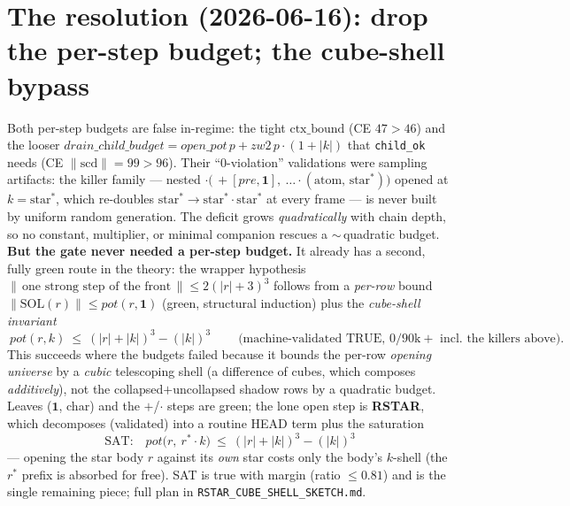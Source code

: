 \documentclass{article}
\newcommand{\rs}[1]{\lvert #1\rvert}                 %
\newcommand{\rss}[1]{\lVert #1\rVert}                %
\newcommand{\sd}{\mathrm{scd}}                       %
\newcommand{\ctxb}{\mathrm{ctx\_bound}}
\newcommand{\SOL}{\mathrm{SOL}}
\newcommand{\seq}{\cdot}
\newcommand{\alt}{+}
\newcommand{\one}{\mathbf 1}
\begin{document}
\section{The resolution (2026-06-16): drop the per-step budget; the cube-shell bypass}\label{sec:resolution}
Both per-step budgets are false in-regime: the tight $\ctxb$ (CE $47>46$) and the looser
$\textit{drain\_child\_budget}=\textit{open\_pot}\,p+\textit{zw2}\,p\cdot(1{+}\rs k)$ that \texttt{child\_ok} needs
(CE $\rss{\sd}=99>96$). Their ``$0$-violation'' validations were sampling artifacts: the killer family --- nested
$\seq\bigl(\,{+}[\textit{pre},\one],\ \dots\seq(\text{atom},\,\text{star}^{*})\bigr)$ opened at $k=\text{star}^{*}$,
which re-doubles $\text{star}^{*}\!\to\!\text{star}^{*}\!\seq\text{star}^{*}$ at every frame --- is never built by
uniform random generation. The deficit grows \emph{quadratically} with chain depth, so no constant, multiplier, or
minimal companion rescues a $\sim$\,quadratic budget.
\smallskip\\
\textbf{But the gate never needed a per-step budget.} It already has a second, fully green route in the theory: the
wrapper hypothesis $\rss{\,\text{one strong step of the front}\,}\le2(\rs r+3)^3$ follows from a \emph{per-row} bound
$\rss{\SOL(r)}\le\textit{pot}(r,\one)$ (green, structural induction) plus the \emph{cube-shell invariant}
\[
\boxed{\ \textit{pot}(r,k)\ \le\ (\rs r+\rs k)^3-(\rs k)^3\ }\qquad\text{(machine-validated TRUE, $0/90$k$+$ incl.\ the killers above).}
\]
This succeeds where the budgets failed because it bounds the per-row \emph{opening universe} by a \emph{cubic}
telescoping shell (a difference of cubes, which composes \emph{additively}), not the collapsed$+$uncollapsed shadow
rows by a quadratic budget. Leaves ($\one$, char) and the $\alt$/$\seq$ steps are green; the lone open step is
\textbf{RSTAR}, which decomposes (validated) into a routine HEAD term plus the saturation
\[
\text{SAT:}\quad \textit{pot}\bigl(r,\ r^{*}\!\seq k\bigr)\ \le\ (\rs r+\rs k)^3-(\rs k)^3
\]
--- opening the star body $r$ against its \emph{own} star costs only the body's $k$-shell (the $r^{*}$ prefix is
absorbed for free). SAT is true with margin (ratio $\le0.81$) and is the single remaining piece; full plan in
\texttt{RSTAR\_CUBE\_SHELL\_SKETCH.md}.
\end{document}

